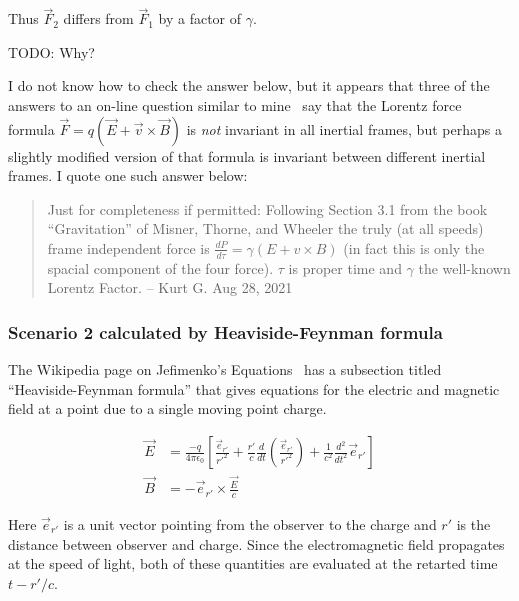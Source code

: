 \documentclass[a4paper]{article}
\theoremstyle{plain}
\theoremstyle{definition}
\newcommand{\vect}[1]{\vec{#1}}
\begin{document}
Thus $\vect{F}_2$ differs from $\vect{F}_1$ by a factor of $\gamma$.

TODO: Why?

I do not know how to check the answer below, but it appears that three
of the answers to an on-line question similar to
mine~\cite{PhysicsSEIsLorentzForceFrameIndependent} say that the
Lorentz force formula $\vect{F} = q(\vect{E} + \vect{v} \times
\vect{B})$ is {\em not} invariant in all inertial frames, but perhaps
a slightly modified version of that formula is invariant between
different inertial frames.  I quote one such answer below:

\begin{quote}
Just for completeness if permitted: Following Section 3.1 from the
book ``Gravitation'' of Misner, Thorne, and Wheeler the truly (at all
speeds) frame independent force is $\frac{dP}{d \tau} = \gamma (E + v
\times B)$ (in fact this is only the spacial component of the four
force).  $\tau$ is proper time and $\gamma$ the well-known Lorentz
Factor. -- Kurt G. Aug 28, 2021
\end{quote}


\subsubsection{Scenario 2 calculated by Heaviside-Feynman formula}

The Wikipedia page on Jefimenko's Equations~\cite{JefimenkosEquations}
has a subsection titled ``Heaviside-Feynman formula'' that gives
equations for the electric and magnetic field at a point due to a
single moving point charge.

\begin{align}
\vect{E} & = \frac{-q}{4 \pi \epsilon_0}
             \left[
               \frac{\vect{e}_{r'}}{r'^2}
               + \frac{r'}{c} \frac{d}{dt} \left( \frac{\vect{e}_{r'}}{r'^2} \right)
               + \frac{1}{c^2} \frac{d^2}{dt^2} \vect{e}_{r'}
             \right]
             \label{eq:HF-EforPtChg} \\
\vect{B} & = - \vect{e}_{r'} \times \frac{\vect{E}}{c}
             \label{eq:HF-BforPtChg}
\end{align}

Here $\vect{e}_{r'}$ is a unit vector pointing from the observer to
the charge and $r'$ is the distance between observer and charge.
Since the electromagnetic field propagates at the speed of light, both
of these quantities are evaluated at the retarted time $t - r'/c$.
\end{document}
